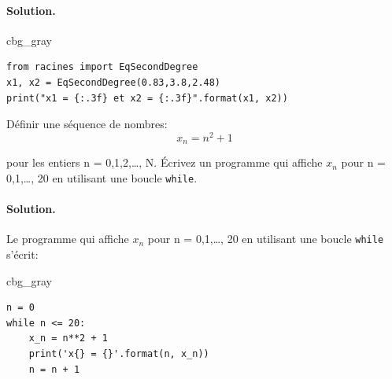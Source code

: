 \documentclass[%
oneside,                 %
final,                   %
10pt,french]{article}
\newenvironment{_cod_tight}[1]{
   \def\FrameCommand{\colorbox{#1}}
   \FrameRule0.6pt\MakeFramed {\FrameRestore}\vskip3mm}
   {\vskip0mm\endMakeFramed}
\newenvironment{cod}[1]{
\bgroup\rmfamily
\fboxsep=0mm\relax
\begin{_cod_tight}{#1}
\list{}{\parsep=-2mm\parskip=0mm\topsep=0pt\leftmargin=2mm
\rightmargin=2\leftmargin\leftmargin=4pt\relax}
\item\relax}
{\endlist\end{_cod_tight}\egroup}
\newenvironment{doconceexercise}{}{}
\newcounter{doconceexercisecounter}
\begin{document}
\begin{doconceexercise}
\paragraph{Solution.}
\begin{cod}{cbg_gray}\begin{verbatim}
from racines import EqSecondDegree
x1, x2 = EqSecondDegree(0.83,3.8,2.48)
print("x1 = {:.3f} et x2 = {:.3f}".format(x1, x2))
\end{verbatim}
\end{cod}
\noindent


\end{doconceexercise}




\begin{doconceexercise}



Définir une séquence de nombres: $$x_n = n^2 + 1$$

pour les entiers n = 0,1,2,…, N. Écrivez un programme qui affiche $x_n$ pour n = 0,1,…, 20 en utilisant une boucle \texttt{while}.


\paragraph{Solution.}
Le programme qui affiche $x_n$ pour n = 0,1,…, 20 en utilisant une boucle \texttt{while} s'écrit:
\begin{cod}{cbg_gray}\begin{verbatim}
n = 0
while n <= 20:
    x_n = n**2 + 1
    print('x{} = {}'.format(n, x_n))
    n = n + 1
\end{verbatim}
\end{cod}
\noindent


\end{doconceexercise}


\end{document}
